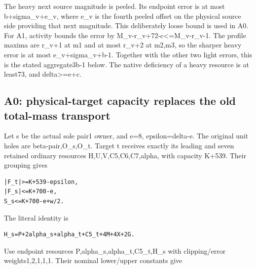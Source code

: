 \documentclass[10pt,a4paper]{article}
\theoremstyle{definition}
\begin{document}
The heavy next source magnitude is peeled. Its endpoint error is at most
b+\allowbreak{}sigma\_\allowbreak{}v+\allowbreak{}e\_\allowbreak{}v,\allowbreak{} where e\_\allowbreak{}v is the fourth peeled offset on the physical
source side providing that next magnitude. This deliberately loose bound
is used in A0. For A1,\allowbreak{} activity bounds the error by
M\_\allowbreak{}v-r\_\allowbreak{}v+\allowbreak{}72-c\textless=\allowbreak{}M\_\allowbreak{}v-r\_\allowbreak{}v-1. The profile maxima are r\_\allowbreak{}v+\allowbreak{}1 at m1
and at most r\_\allowbreak{}v+\allowbreak{}2 at m2,\allowbreak{}m3,\allowbreak{} so the sharper heavy error is at most
e\_\allowbreak{}v+\allowbreak{}sigma\_\allowbreak{}v+\allowbreak{}b-1. Together with the other two light errors,\allowbreak{} this is the
stated aggregate3b-1 below. The native deficiency of a heavy resource is
at least73,\allowbreak{} and delta\textgreater=\allowbreak{}e+\allowbreak{}c.

\hypertarget{a0-physical-target-capacity-replaces-the-old-total-mass-transport}{%
\subsection{A0: physical-target capacity replaces the old total-mass
transport}\label{a0-physical-target-capacity-replaces-the-old-total-mass-transport}}

Let s be the actual sole pair1 owner,\allowbreak{} and e=\allowbreak{}8,\allowbreak{} epsilon=\allowbreak{}delta-e. The
original unit holes are beta-pair,\allowbreak{}O\_\allowbreak{}s,\allowbreak{}O\_\allowbreak{}t. Target t receives exactly
its leading and seven retained ordinary resources H,\allowbreak{}U,\allowbreak{}V,\allowbreak{}C5,\allowbreak{}C6,\allowbreak{}C7,\allowbreak{}alpha,\allowbreak{}
with capacity K+\allowbreak{}539. Their grouping gives

\begin{lstlisting}
|F_t|>=K+539-epsilon,
|F_s|<=K+700-e,
S_s<=K+700-e+w/2.
\end{lstlisting}

The literal identity is

\begin{lstlisting}
H_s=P+2alpha_s+alpha_t+C5_t+4M+4X+2G.
\end{lstlisting}

Use endpoint resources P,\allowbreak{}alpha\_\allowbreak{}s,\allowbreak{}alpha\_\allowbreak{}t,\allowbreak{}C5\_\allowbreak{}t,\allowbreak{}H\_\allowbreak{}s with
clipping/error weights1,\allowbreak{}2,\allowbreak{}1,\allowbreak{}1,\allowbreak{}1. Their nominal lower/upper constants
give
\end{document}
